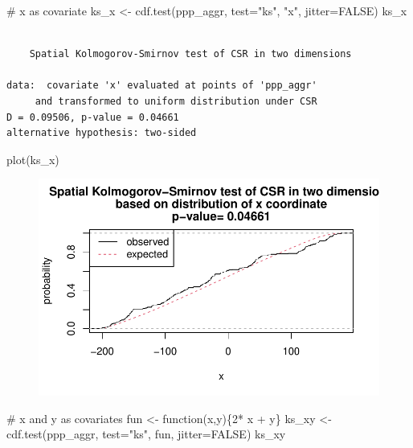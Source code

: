 \documentclass[
  letterpaper,
  DIV=11,
  numbers=noendperiod]{scrreprt}
\newenvironment{Shaded}{\begin{snugshade}}{\end{snugshade}}
\newcommand{\AttributeTok}[1]{\textcolor[rgb]{0.40,0.45,0.13}{#1}}
\newcommand{\CommentTok}[1]{\textcolor[rgb]{0.37,0.37,0.37}{#1}}
\newcommand{\ConstantTok}[1]{\textcolor[rgb]{0.56,0.35,0.01}{#1}}
\newcommand{\ControlFlowTok}[1]{\textcolor[rgb]{0.00,0.23,0.31}{#1}}
\newcommand{\DecValTok}[1]{\textcolor[rgb]{0.68,0.00,0.00}{#1}}
\newcommand{\FunctionTok}[1]{\textcolor[rgb]{0.28,0.35,0.67}{#1}}
\newcommand{\NormalTok}[1]{\textcolor[rgb]{0.00,0.23,0.31}{#1}}
\newcommand{\OtherTok}[1]{\textcolor[rgb]{0.00,0.23,0.31}{#1}}
\newcommand{\SpecialCharTok}[1]{\textcolor[rgb]{0.37,0.37,0.37}{#1}}
\newcommand{\StringTok}[1]{\textcolor[rgb]{0.13,0.47,0.30}{#1}}
\begin{document}
\begin{Shaded}
\begin{Highlighting}[]
\CommentTok{\# x as covariate}
\NormalTok{ks\_x }\OtherTok{\textless{}{-}} \FunctionTok{cdf.test}\NormalTok{(ppp\_aggr, }\AttributeTok{test=}\StringTok{"ks"}\NormalTok{, }\StringTok{"x"}\NormalTok{, }\AttributeTok{jitter=}\ConstantTok{FALSE}\NormalTok{)}
\NormalTok{ks\_x}
\end{Highlighting}
\end{Shaded}

\begin{verbatim}

    Spatial Kolmogorov-Smirnov test of CSR in two dimensions

data:  covariate 'x' evaluated at points of 'ppp_aggr' 
     and transformed to uniform distribution under CSR
D = 0.09506, p-value = 0.04661
alternative hypothesis: two-sided
\end{verbatim}

\begin{Shaded}
\begin{Highlighting}[]
\FunctionTok{plot}\NormalTok{(ks\_x)}
\end{Highlighting}
\end{Shaded}

\begin{figure}[H]

{\centering \includegraphics{spatial-tests_files/figure-pdf/unnamed-chunk-36-2.pdf}

}

\end{figure}

\begin{Shaded}
\begin{Highlighting}[]
\CommentTok{\# x and y as covariates}
\NormalTok{fun }\OtherTok{\textless{}{-}} \ControlFlowTok{function}\NormalTok{(x,y)\{}\DecValTok{2}\SpecialCharTok{*}\NormalTok{ x }\SpecialCharTok{+}\NormalTok{ y\}}
\NormalTok{ks\_xy }\OtherTok{\textless{}{-}} \FunctionTok{cdf.test}\NormalTok{(ppp\_aggr, }\AttributeTok{test=}\StringTok{"ks"}\NormalTok{, fun, }\AttributeTok{jitter=}\ConstantTok{FALSE}\NormalTok{)}
\NormalTok{ks\_xy}
\end{Highlighting}
\end{Shaded}
\end{document}

